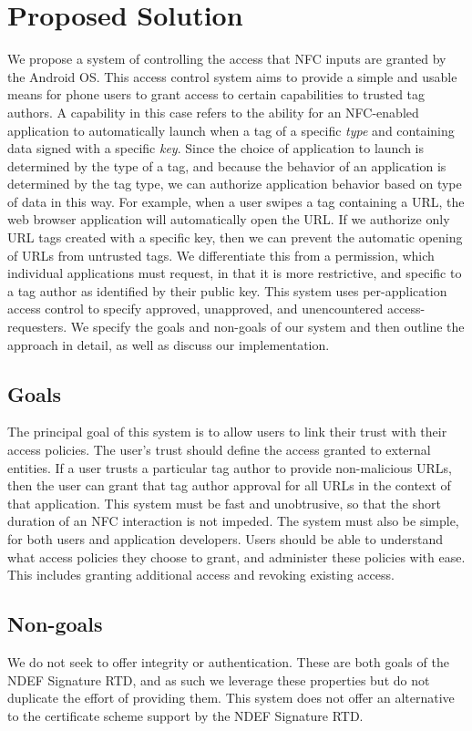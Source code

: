 \documentclass[12pt]{article}
\begin{document}
\section{Proposed Solution}
We propose a system of controlling the access that NFC inputs are granted by the Android OS.
This access control system aims to provide a simple and usable means for phone users to grant access to certain capabilities to trusted tag authors.
A capability in this case refers to the ability for an NFC-enabled application to automatically launch when a tag of a specific \textit{type} and containing data signed with a specific \textit{key}.
Since the choice of application to launch is determined by the type of a tag, and because the behavior of an application is determined by the tag type, we can authorize application behavior based on type of data in this way.
For example, when a user swipes a tag containing a URL, the web browser application will automatically open the URL.
If we authorize only URL tags created with a specific key, then we can prevent the automatic opening of URLs from untrusted tags.
We differentiate this from a permission, which individual applications must request, in that it is more restrictive, and specific to a tag author as identified by their public key.
This system uses per-application access control to specify approved, unapproved, and unencountered access-requesters.
We specify the goals and non-goals of our system and then outline the approach in detail, as well as discuss our implementation.

\subsection{Goals}
The principal goal of this system is to allow users to link their trust with their access policies.
The user's trust should define the access granted to external entities.
If a user trusts a particular tag author to provide non-malicious URLs, then the user can grant that tag author approval for all URLs in the context of that application.
This system must be fast and unobtrusive, so that the short duration of an NFC interaction is not impeded.
The system must also be simple, for both users and application developers.
Users should be able to understand what access policies they choose to grant, and administer these policies with ease.
This includes granting additional access and revoking existing access.

\subsection{Non-goals}
We do not seek to offer integrity or authentication.
These are both goals of the NDEF Signature RTD, and as such we leverage these properties but do not duplicate the effort of providing them.
This system does not offer an alternative to the certificate scheme support by the NDEF Signature RTD.
\end{document}
